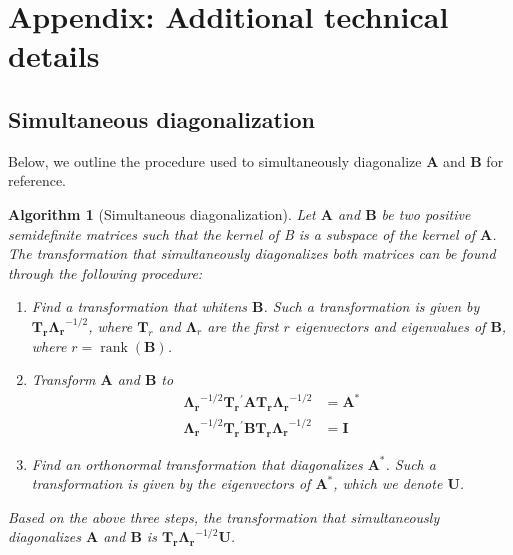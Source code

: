 \documentclass[12pt]{article} %
\newtheorem{algorithm}[theorem]{Algorithm}
\newcommand{\trans}{\ensuremath{^\prime}}
\DeclareMathOperator{\rank}{rank}
\begin{document}
\section{Appendix: Additional technical details}

\subsection{Simultaneous diagonalization}

Below, we outline the procedure used to simultaneously diagonalize $\bm{A}$ and $\bm{B}$ for reference.

\begin{algorithm}[Simultaneous diagonalization]
Let $\bm{A}$ and $\bm{B}$ be two positive semidefinite matrices such that the kernel of B is a subspace of the kernel of $\bm{A}$. The transformation that simultaneously diagonalizes both matrices can be found through the following procedure:
\begin{enumerate}
\item Find a transformation that whitens $\bm{B}$. Such a transformation is given by $\bm{T_r \Lambda_r}^{-1/2}$, where $\bm{T}_r$ and $\bm{\Lambda}_r$ are the first $r$  eigenvectors and eigenvalues of $\bm{B}$, where $r = \rank(\bm{B})$. 

\item Transform $\bm{A}$ and $\bm{B}$ to
\begin{align}
\bm{\Lambda_r}^{-1/2} \bm{T_r}\trans \bm{A T_r \Lambda_r}^{-1/2} &= \bm{A}^* \label{eq:astar} \\
\bm{\Lambda_r}^{-1/2} \bm{T_r}\trans \bm{B T_r \Lambda_r}^{-1/2} &= \bm{I}
\end{align}

\item Find an orthonormal transformation that diagonalizes $\bm{A}^*$. Such a transformation is given by the eigenvectors of $\bm{A}^*$, which we denote $\bm{U}$.
\end{enumerate}

\noindent
Based on the above three steps, the transformation that simultaneously diagonalizes $\bm{A}$ and $\bm{B}$ is $\bm{T_r \Lambda_r}^{-1/2} \bm{U}$.\\ 
\end{algorithm}
\end{document}
